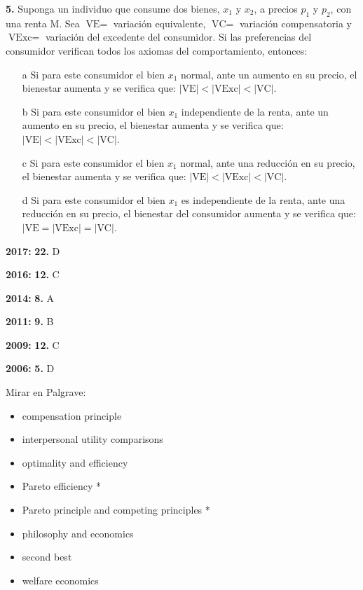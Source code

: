 \documentclass{nuevotema}
\begin{document}

\textbf{5.} Suponga un individuo que consume dos bienes, $x_1$ y $x_2$, a precios $p_1$ y $p_2$, con una renta M. Sea $\text{VE} = $ variación equivalente, $\text{VC} =$ variación compensatoria y $\text{VExc} =$ variación del excedente del consumidor. Si las preferencias del consumidor verifican todos los axiomas del comportamiento, entonces:

\begin{itemize}
	\item[a] Si para este consumidor el bien $x_1$ normal, ante un aumento en su precio, el bienestar aumenta y se verifica que: $| \text{VE} | < | \text{VExc} | < | \text{VC} |$. 
	\item[b] Si para este consumidor el bien $x_1$ independiente de la renta, ante un aumento en su precio, el bienestar aumenta y se verifica que: $|\text{VE}| < |\text{VExc}| < |\text{VC}|$.
	\item[c] Si para este consumidor el bien $x_1$ normal, ante una reducción en su precio, el bienestar aumenta y se verifica que: $|\text{VE}| < |\text{VExc}| < |\text{VC}|$.
	\item[d] Si para este consumidor el bien $x_1$ es independiente de la renta, ante una reducción en su precio, el bienestar del consumidor aumenta y se verifica que: $|\text{VE}=|\text{VExc} | = |\text{VC} |$. 
\end{itemize}

\notas

\textbf{2017:} \textbf{22.} D

\textbf{2016:} \textbf{12.} C

\textbf{2014:} \textbf{8.} A

\textbf{2011:} \textbf{9.} B

\textbf{2009:} \textbf{12.} C

\textbf{2006:} \textbf{5.} D


\bibliografia

Mirar en Palgrave:
\begin{itemize}
	\item compensation principle
	\item interpersonal utility comparisons
	\item optimality and efficiency
	\item Pareto efficiency *
	\item Pareto principle and competing principles *
	\item philosophy and economics
	\item second best
	\item welfare economics
\end{itemize}
\end{document}
